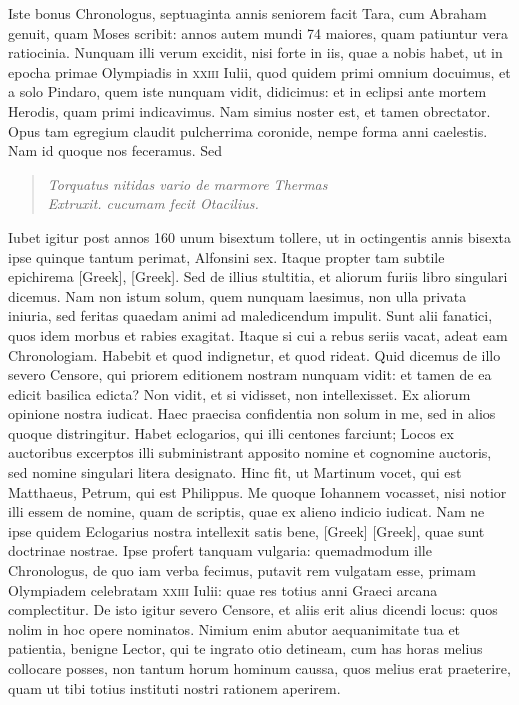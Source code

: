 Iste bonus
Chronologus, septuaginta annis seniorem facit Tara, cum Abraham
genuit, quam Moses scribit: annos autem mundi 74 maiores,
quam patiuntur vera ratiocinia.
Nunquam illi verum excidit, nisi
forte in iis, quae a nobis habet, ut in epocha primae Olympiadis in
\textsc{xxiii} Iulii, quod quidem primi omnium docuimus, et a solo
Pindaro, quem iste nunquam vidit, didicimus: et in eclipsi ante
mortem Herodis, quam primi indicavimus.
Nam simius noster est,
et tamen obrectator.
Opus tam egregium claudit pulcherrima
coronide, nempe forma anni caelestis.
Nam id quoque nos feceramus.
Sed
\begin{quote}
\textit{Torquatus nitidas vario de marmore Thermas}\\
	\textit{Extruxit. cucumam fecit Otacilius.}
\end{quote}
Iubet igitur post annos 160 unum bisextum tollere, ut in octingentis
annis bisexta ipse quinque tantum perimat, Alfonsini sex.
Itaque propter tam subtile epichirema \textgreek{[Greek]}, \textgreek{[Greek]}.
Sed de illius stultitia, et aliorum furiis libro singulari dicemus.
Nam non istum solum, quem nunquam laesimus, non ulla privata iniuria,
sed feritas quaedam animi ad maledicendum impulit.
Sunt alii
fanatici, quos idem morbus et rabies exagitat.
Itaque si cui a rebus
seriis vacat, adeat eam Chronologiam.
Habebit et quod indignetur,
et quod rideat.
Quid dicemus de illo severo Censore, qui priorem
editionem nostram nunquam vidit: et tamen de ea edicit basilica
edicta?
Non vidit, et si vidisset, non intellexisset.
Ex aliorum opinione
nostra iudicat.
Haec praecisa confidentia non solum in me,
sed in alios quoque distringitur.
Habet eclogarios, qui illi centones
farciunt;
Locos ex auctoribus excerptos illi subministrant apposito
nomine et cognomine auctoris, sed nomine singulari litera designato.
Hinc fit, ut Martinum vocet, qui est Matthaeus, Petrum, qui est
Philippus.
Me quoque Iohannem vocasset, nisi notior illi essem de
nomine, quam de scriptis, quae ex alieno indicio iudicat.
Nam
ne ipse quidem Eclogarius nostra intellexit satis bene, \textgreek{[Greek]}
\textgreek{[Greek]}, quae sunt doctrinae nostrae.
Ipse profert tanquam vulgaria: quemadmodum ille Chronologus, de quo iam
verba fecimus, putavit rem vulgatam esse, primam Olympiadem
celebratam \textsc{xxiii} Iulii:
 quae res totius anni Graeci arcana complectitur.
De isto igitur severo Censore, et aliis erit alius dicendi locus:
quos nolim in hoc opere nominatos.
{}
Nimium enim abutor aequanimitate
tua et patientia, benigne Lector, qui te ingrato otio detineam,
cum has horas melius collocare posses, non tantum horum
hominum caussa, quos melius erat praeterire, quam ut tibi totius instituti
nostri rationem aperirem.

